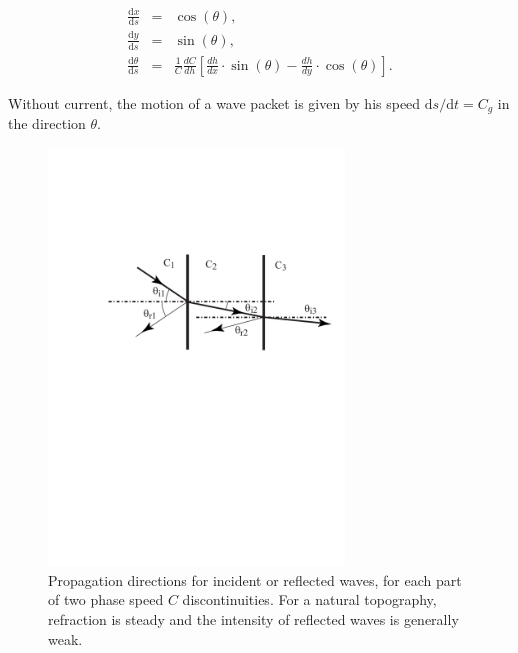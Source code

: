 \begin{eqnarray}
\label{Ray eq}
\frac{\mathrm{d}x}{\mathrm{d}s} &=&\cos \left( \theta \right),  \label{Ray eq 1} \\
\frac{\mathrm{d}y}{\mathrm{d}s} &=&\sin \left( \theta \right),  \label{Ray eq 2} \\
\frac{\mathrm{d}\theta }{\mathrm{d}s} &=&\frac{1}{C}\frac{dC}{dh}\left[ \frac{dh}{dx}\cdot
\sin \left( \theta \right) -\frac{dh}{dy}\cdot \cos \left( \theta \right)
\right].  \label{Ray eq 3}
\end{eqnarray}

Without current, the motion of a wave packet is given by his speed
$\mathrm{d}s/\mathrm{d}t=C_g$ in the direction $\theta$.

\begin{figure}[htb]
\centerline{\includegraphics[width=0.7\textwidth]{FIGS_CH_SHALLOWLIN/refraction_Snel.pdf}}
    \caption{Propagation directions for incident or reflected waves, for each part of two
    phase speed $C$ discontinuities. For a natural topography, refraction is steady and the intensity
    of reflected waves is generally weak.}
\label{fig:Snel}
\end{figure}

